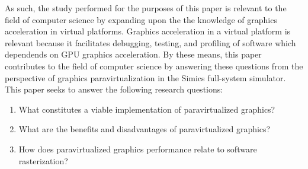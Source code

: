 As such, the study performed for the purposes of this paper is relevant to the field of computer science by expanding upon the the knowledge of graphics acceleration in virtual platforms. Graphics acceleration in a virtual platform is relevant because it facilitates debugging, testing, and profiling of software which dependends on GPU graphics acceleration.
By these means, this paper contributes to the field of computer science by answering these questions from the perspective of graphics paravirtualization in the Simics full-system simulator.
This paper seeks to answer the following research questions:

\begin{enumerate}
  \item What constitutes a viable implementation of paravirtualized graphics?
  \item What are the benefits and disadvantages of paravirtualized graphics?
  \item How does paravirtualized graphics performance relate to software rasterization?
\end{enumerate}
